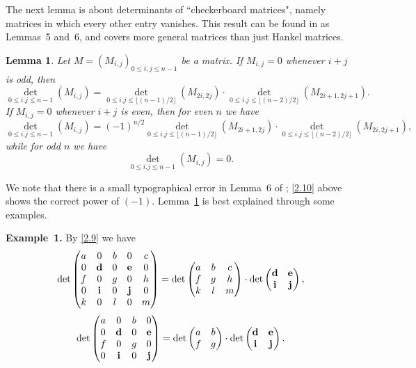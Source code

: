 \documentclass{amsart}
\theoremstyle{plain}
\newtheorem{lemma}[theorem]{Lemma}
\numberwithin{equation}{section}
\begin{document}
The next lemma is about determinants of ``checkerboard matrices", namely 
matrices in which every other entry vanishes. This result can be found in 
\cite{CK} as Lemmas~5 and~6, and covers more general matrices than just Hankel
matrices.

\begin{lemma}\label{lem:2.2}
Let $M=\left(M_{i,j}\right)_{0\leq i,j\leq n-1}$ be a matrix.
If $M_{i,j}=0$ whenever $i+j$ is odd, then
\begin{equation}\label{2.9}
\det_{0\leq i.j\leq n-1}(M_{i,j})
=\det_{0\leq i.j\leq\lfloor(n-1)/2\rfloor}(M_{2i,2j})
\cdot\det_{0\leq i.j\leq\lfloor(n-2)/2\rfloor}(M_{2i+1,2j+1}).
\end{equation}
If $M_{i,j}=0$ whenever $i+j$ is even, then for even $n$ we have 
\begin{equation}\label{2.10}
\det_{0\leq i.j\leq n-1}(M_{i,j})=
(-1)^{n/2}\det_{0\leq i.j\leq\lfloor(n-1)/2\rfloor}(M_{2i+1,2j})
\cdot\det_{0\leq i.j\leq\lfloor(n-2)/2\rfloor}(M_{2i,2j+1}), 
\end{equation}
while for odd $n$ we have
\begin{equation}\label{2.11}
\det_{0\leq i.j\leq n-1}(M_{i,j}) = 0.
\end{equation}
\end{lemma}

We note that there is a small typographical error in Lemma~6 of \cite{CK}; 
\eqref{2.10} above shows the correct power of $(-1)$.
Lemma~\ref{lem:2.2} is best explained through some examples.

\medskip
\noindent
{\bf Example~1.} By \eqref{2.9} we have
\[
\det\begin{pmatrix}a & 0 & b & 0 & c\\
0 & {\bf d} & 0 & {\bf e} & 0\\
f & 0 & g & 0 & h\\
0 & {\bf i} & 0 & {\bf j} & 0\\
k & 0 & l & 0 & m
\end{pmatrix}=\det\begin{pmatrix}a & b & c\\
f & g & h\\
k & l & m
\end{pmatrix}\cdot\det\begin{pmatrix}{\bf d} & {\bf e}\\
{\bf i} & {\bf j}
\end{pmatrix},
\]
\[
\det\begin{pmatrix}a & 0 & b & 0\\
0 & {\bf d} & 0 & {\bf e}\\
f & 0 & g & 0\\
0 & {\bf i} & 0 & {\bf j}
\end{pmatrix}=\det\begin{pmatrix}a & b\\
f & g
\end{pmatrix}\cdot\det\begin{pmatrix}{\bf d} & {\bf e}\\
{\bf i} & {\bf j}
\end{pmatrix}.
\]
\end{document}
